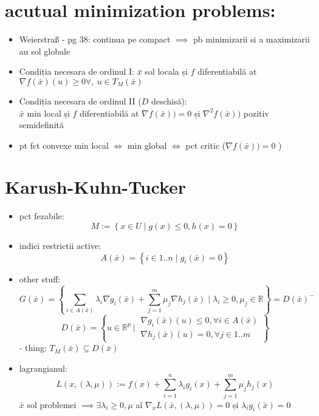 \documentclass[11pt]{article}
\newcommand{\R}{\mathbb{R}}
\begin{document}
\section*{acutual minimization problems:}
\label{sec:org8d37a08}
\begin{itemize}
\item Weierstraß - pg 38: continua pe compact \(\implies\) pb minimizarii si a maximizarii au sol globale
\item Condiția necesara de ordinul I:
\(\bar{x}\) sol locala și \(f\) diferentiabilă at \(\nabla f(\bar{x})(u) \geq 0 \forall, ~
   u \in T_M(\bar{x})\)
\item Condiția necesara de ordinul II (\(D\) deschisă):\\
\(\bar{x}\) min local și \(f\) diferentiabilă at \(\nabla f(\bar{x})) = 0\) și 
 \(\nabla^2 f(\bar{x}))\) pozitiv semidefinită
\item pt fct convexe min local \(\iff\) min global \(\iff\) pct critic (\(\nabla f(\bar{x})) = 0\) )
\end{itemize}

\section*{Karush-Kuhn-Tucker}
\label{sec:org1ef6339}
\begin{itemize}
\item pct fezabile:
\[ M := \left\{ x \in U \mid g(x) \leq 0, h(x) = 0 \right\} \]
\item indici restrictii active:
\[ A(\bar{x}) = \left\{ i \in 1..n \mid g_i (\bar{x}) = 0  \right\} \]
\item other stuff:
  \[ G (\bar{x}) = \left\{
\sum_{i \in A(\bar{x})} \lambda_i \nabla g_i(\bar{x}) + \sum_{j =1}^{m} \mu_j \nabla h_j (\bar{x}) \mid 
 \lambda_i \ge 0, \mu_j \in \R
 \right\} = D(\bar{x})^- \]
  \[
  D(\bar{x}) = \left\{ u \in \R^p ~ \Big |~ \begin{matrix} 
  \nabla g_i(\bar{x})(u) \leq 0, \forall i \in A(\bar{x}) \\
  \nabla h_j(\bar{x})(u) = 0, \forall j \in 1..m
\end{matrix}
\right\}
  \]
 - thing: \( T_M(\bar{x}) \subseteq D(\bar{x}) \)
\item lagrangianul:
\[
L(x, (\lambda, \mu)) := f(x) + \sum_{i=1}^n \lambda_i g_i(x) + \sum_{j=1}^m \mu_j h_j(x)
\]
\(\bar{x}\)  sol problemei \(\implies \exists \lambda_i \geq 0, \mu\) aî \(\nabla_x L(\bar{x}, (\lambda, \mu)) = 0\) și
 \(\lambda_i g_i(\bar{x}) = 0\)
\end{itemize}
\end{document}
